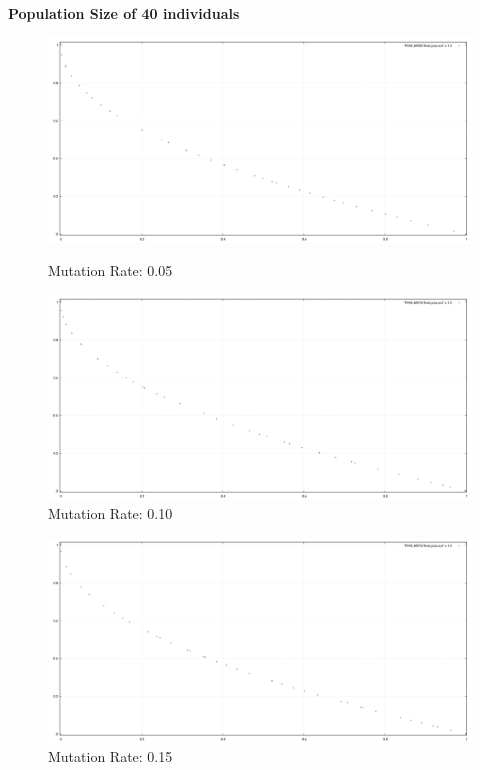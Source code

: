 \documentclass{article}
\begin{document}
\textbf{Population Size of 40 individuals}
\begin{figure}[h]
    \centering
    \begin{minipage}{0.49\textwidth}
        \includegraphics[width=\linewidth]{population_plot/P040_M005.png}
        \caption{Mutation Rate: 0.05}
        \label{fig:P040_M005}
    \end{minipage}
    \hfill
    \begin{minipage}{0.49\textwidth}
        \includegraphics[width=\linewidth]{population_plot/P040_M010.png}
        \caption{Mutation Rate: 0.10}
        \label{fig:P040_M010}
    \end{minipage}
\end{figure}
\begin{figure}[h]
    \centering
    \includegraphics[width=0.49\linewidth]{population_plot/P040_M015.png}
    \caption{Mutation Rate: 0.15}
    \label{fig:P040_M015}
\end{figure}
\end{document}
